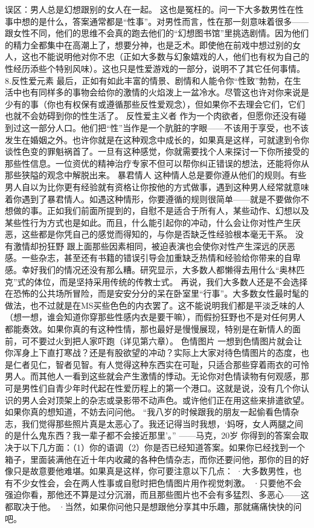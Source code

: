 \documentclass[12pt,UTF8,openany]{ctexbook}
\begin{document}
误区：男人总是幻想跟别的女人在一起。
这也是冤枉的。问一下大多数男性在性事中想的是什么，答案通常都是“性事”。对男性而言，性在那一刻意味着很多——跟女性不同，他们的思维不会真的跑去他们的“幻想图书馆”里挑选剧情。因为他们的精力全都集中在高潮上了，想要分神，也是乏术。即使他在前戏中想过别的女人，这也不能说明他对你不忠（正如大多数与幻象嬉戏的人，他们也有权为自己的性经历添些个特别风味）。这也只是性爱游戏的一部分，说明不了其它任何事情。
8.反性爱元素
最后，正如有如此丰富的情景、剧情和人能令你“性致”勃勃，在生活中也有同样多的事物会给你的激情的火焰泼上一盆冷水。尽管这也许对你来说是少有的事（你也有权保有或遵循那些反性爱观念），但如果你不去理会它们，它们也就不会妨碍到你的性生活了。
反性爱主义者
作为一个肉欲者，但愿你还没有碰到过这一部分人口。他们把“性”当作是一个肮脏的字眼——不该用于享受，也不该发生在婚姻之外。也许你就是在这种观念中成长的，如果真是这样，可就逮到令你谈性色变的罪魁祸首了。一旦有这种感觉，你就需要找个人来探讨一下你所接受的那些性信息。一位资优的精神治疗专家不但可以帮你纠正错误的想法，还能将你从那些狭隘的观念中解脱出来。
暴君情人
这种情人总是要你遵从他们的规则。有些男人自以为比你更有经验就有资格让你按他的方式做事，遇到这种男人经常就意味着你遇到了暴君情人。如遇这种情形，你要遵循的规则很简单——就是不要做你不想做的事。正如我们前面所提到的，自慰不是适合于所有人，某些动作、幻想以及某些性行为方式也是如此。而且，什么能引起你的冲动，什么会让你对性产生厌恶，这些都是你凭自己的感觉而得知的，与你是否缺乏性经验根本毫无干系。
没有激情却扮狂野
跟上面那些因素相同，被迫表演也会使你对性产生深远的厌恶感。一些杂志，甚至还有书籍的错误引导会加重缺乏热情和经验给你带来的自卑感。幸好我们的情况还没有那么糟。研究显示，大多数人都懒得去用什么“奥林匹克”式的体位，而是坚持采用传统的传教士式。
再说，我们大多数人还是不会选择在恐怖的公共场所冒险，而是安安分分的呆在卧室里“行事”。大多数女性最时髦的做法，也不过就是在MS买些色色的内衣罢了。这不能说明我们都是平淡乏味的人（想一想，谁会知道你穿那些性感内衣是要干嘛），而假扮狂野也不是对任何男人都能奏效。如果你真的有这种性情，那也最好是慢慢展现，特别是在新情人的面前，可不要过火到把人家吓跑（详见第六章）。
色情图片
一想到色情图片就会让你浑身上下直打寒战？还是有股欲望的冲动？实际上大家对待色情图片的态度，也是仁者见仁，智者见智。有人觉得这种东西实在可耻，只适合那些穿着雨衣的可怜男人。而其他人一看到这些就会产生激情的悸动。无论你对色情读物有何观感，那可是男性们自青少年时代起在性爱历程上的第一个港口。这就是说，没有几个你认识的男人会对顶架上的杂志或录影带不动声色。或许他们正在用这些来排遣欲望。如果你真的想知道，不妨去问问他。
“我八岁的时候跟我的朋友一起偷看色情杂志，我们觉得那些照片真是太恶心了。我还记得当时我想，‘妈呀，女人两腿之间的是什么鬼东西？我一辈子都不会接近那里’。”
——马克，20岁
你得到的答案会取决于以下几方面：（1）你的语调（2）你是否已经知道答案。如果你已经找到一个箱子，里面装满他在近十年内收藏的各种色情杂志，而你还要问他，那你的目的好像只是故意要他难堪。如果真是这样，你可要注意以下几点：
·大多数男性，也有不少女性会，会在两人性事或自慰时把色情图片用作视觉刺激。
·只要他不会强迫你看，那他还不算是过分沉溺，而且那些图片也不会有多猛烈、多恶心——这都取决于他。
·当然，如果你问他只是想跟他分享其中乐趣，那就痛痛快快的问吧。
\end{document}
